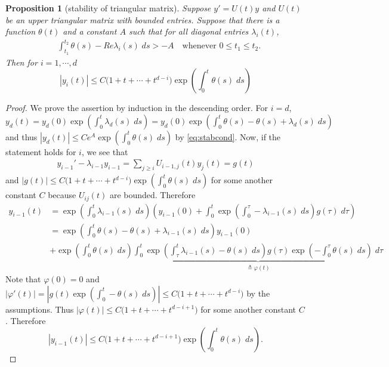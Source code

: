 \documentclass[a4paper,11pt]{article}
\newtheorem{proposition}{Proposition}[section]
\theoremstyle{remark}
\begin{document}
 \begin{proposition}[stability of triangular matrix] \label{prop:tri-stab}
 Suppose $y' = U(t) y$ and $U(t)$ be an upper triangular matrix with bounded entries. Suppose that there is a function $\theta(t)$ and a constant $A$ such that for all diagonal entries $\lambda_i(t)$,
 \begin{align} \label{eq:stabcond}
  &\int_{t_1}^{t_2} \theta(s)-Re\lambda_i(s)\; ds > -A \quad \text{whenever $0\le t_1 \le t_2$.}
 \end{align}
 Then for $i=1,\cdots,d$
 \begin{equation} \label{eq:triestim}
|y_{i}(t)| \le C\big( 1 + t + \cdots + t^{d-i}\big) \exp\left( \int_0^t \theta(s)\;ds\right)%
 \end{equation}
\end{proposition}
\begin{proof}
 We prove the assertion by induction in the descending order. For $i=d$, $y_d(t)=y_d(0)\exp\left( \int_0^t \lambda_d(s)\;ds\right)=y_d(0)\exp\left( \int_0^t \theta(s)-\theta(s)+\lambda_d(s)\;ds\right)$ and thus $|y_d(t)| \le Ce^A\exp\left( \int_0^t \theta(s)\;ds\right)$ by \eqref{eq:stabcond}. Now, if the statement holds for $i$, we see that
 \begin{align*}
  y_{i-1}' -\lambda_{i-1}y_{i-1} = \sum_{j\ge i} U_{i-1,j}(t)y_j(t) = g(t)
 \end{align*}
 and $|g(t)| \le C\big( 1 + t + \cdots + t^{d-i}\big) \exp\left( \int_0^t \theta(s)\;ds\right)$ for some another constant $C$ because $U_{ij}(t)$ are bounded. Therefore
 \begin{align*}
  y_{i-1}(t) &= \exp\left( \int_0^t \lambda_{i-1}(s)\;ds\right) \left(y_{i-1}(0) + \int_0^t \exp\left( \int_0^\tau -\lambda_{i-1}(s)\;ds\right)g(\tau) \; d\tau\right)\\
  &=\exp\left( \int_0^t \theta(s)-\theta(s)+\lambda_{i-1}(s)\;ds\right) y_{i-1}(0) \\
  &+ \exp\left( \int_0^t \theta(s)\;ds\right)\underbrace{\int_0^t \exp\left( \int_\tau^t \lambda_{i-1}(s)-\theta(s)\;ds\right)g(\tau)\exp\left( -\int_0^\tau \theta(s)\;ds\right) \; d\tau}_{\triangleq \varphi(t)}
  \end{align*}
 Note that $\varphi(0)=0$ and $|\varphi'(t)| = \left|g(t)\exp\left( \int_0^t -\theta(s)\;ds\right)\right|\le C\big( 1 + t + \cdots + t^{d-i}\big)$ by the assumptions. Thus $|\varphi(t)|\le C\big( 1 + t + \cdots + t^{d-i+1}\big)$ for some another constant $C$. Therefore
 $$|y_{i-1}(t)| \le C\big( 1 + t + \cdots + t^{d-i+1}\big)\exp\left( \int_0^t \theta(s)\;ds\right).$$
\end{proof}
\end{document}
